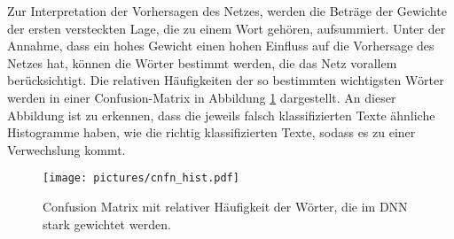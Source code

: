 Zur Interpretation der Vorhersagen des Netzes, werden die Beträge der Gewichte der ersten versteckten Lage,
die zu einem Wort gehören, aufsummiert. Unter der Annahme, dass ein hohes Gewicht einen 
hohen Einfluss auf die Vorhersage des Netzes hat, können die Wörter bestimmt werden,
die das Netz vorallem berücksichtigt. Die relativen Häufigkeiten der so bestimmten wichtigsten 
Wörter werden in einer Confusion-Matrix in Abbildung \ref{fig:cnfn_hist} dargestellt. An dieser 
Abbildung ist zu erkennen, dass die jeweils falsch klassifizierten Texte ähnliche Histogramme haben,
wie die richtig klassifizierten Texte, sodass es zu einer Verwechslung kommt. 

\begin{figure}
    \centering
    \texttt{[image: pictures/cnfn\_hist.pdf]}
    \caption{Confusion Matrix mit relativer Häufigkeit der Wörter, die 
    im DNN stark gewichtet werden.}
    \label{fig:cnfn_hist}
\end{figure}

